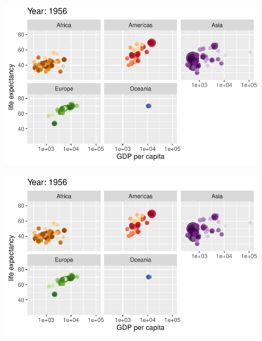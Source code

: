 \documentclass[
  letterpaper,
  DIV=11,
  numbers=noendperiod]{scrartcl}
\begin{document}
\begin{figure}[H]

{\centering \includegraphics{class05_files/figure-pdf/unnamed-chunk-24-8.pdf}

}

\end{figure}

\begin{figure}[H]

{\centering \includegraphics{class05_files/figure-pdf/unnamed-chunk-24-9.pdf}

}

\end{figure}
\end{document}
